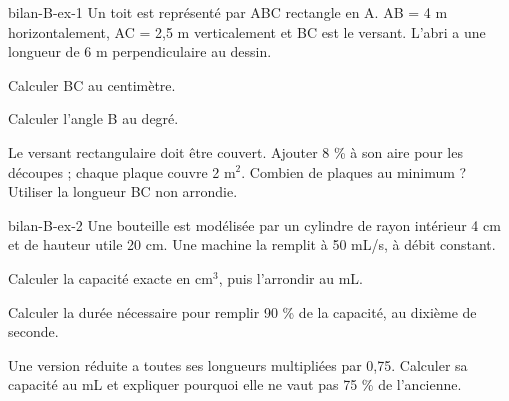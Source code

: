 \begin{blocEdition}{bilan-B-ex-1}
Un toit est représenté par ABC rectangle en A. AB = 4 m horizontalement, AC = 2,5 m verticalement et BC est le versant. L’abri a une longueur de 6 m perpendiculaire au dessin.\begin{questions}
\item Calculer BC au centimètre.
\item Calculer l’angle B au degré.
\item Le versant rectangulaire doit être couvert. Ajouter 8 \% à son aire pour les découpes ; chaque plaque couvre 2 m$^2$. Combien de plaques au minimum ? Utiliser la longueur BC non arrondie.
\end{questions}\par{}\label{fig-bilan-B-ex-1}

\end{blocEdition}
\begin{blocEdition}{bilan-B-ex-2}
Une bouteille est modélisée par un cylindre de rayon intérieur 4 cm et de hauteur utile 20 cm. Une machine la remplit à 50 mL/s, à débit constant.\begin{questions}
\item Calculer la capacité exacte en cm$^3$, puis l’arrondir au mL.
\item Calculer la durée nécessaire pour remplir 90 \% de la capacité, au dixième de seconde.
\item Une version réduite a toutes ses longueurs multipliées par 0,75. Calculer sa capacité au mL et expliquer pourquoi elle ne vaut pas 75 \% de l’ancienne.
\end{questions}\par{}\label{fig-bilan-B-ex-2}

\end{blocEdition}
